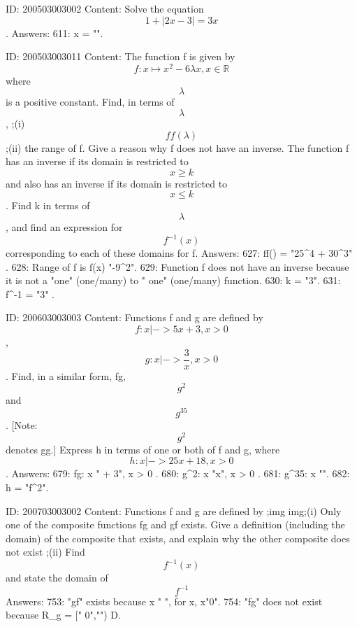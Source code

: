 \documentclass{article}
\begin{document}
ID: 200503003002
Content:
Solve the equation $$1+|2x-3|=3x$$. Answers:
611: x = "".

ID: 200503003011
Content:
The function f is given by $$f : x \mapsto x^2 - 6\lambda x, x \in \mathbb{R}$$ where $$\lambda$$ is a positive constant. Find, in terms of $$\lambda$$, ;(i) $$ff(\lambda)$$;(ii) the range of f. Give a reason why f does not have an inverse. The function f has an inverse if its domain is restricted to $$x \geq k$$ and also has an inverse if its domain is restricted to $$x \leq k$$. Find k in terms of $$\lambda$$, and find an expression for $$f^{- 1} ( x )$$ corresponding to each of these domains for f. Answers:
627: ff(\lambda) = "25\lambda^{4} + 30\lambda^{3}" .
628: Range of f is f(x) \geq "-9\lambda^{2}".
629: Function f does not have an inverse because it is not a "one" (one/many) to " one" (one/many) function.
630: k = "3\lambda".
631: f^{-1} = "3\lambda\pm{}" .

ID: 200603003003
Content:
Functions f and g are defined by $$f:x|->5x+3,x>0$$, $$g:x|->\frac{3}{x},x>0$$. Find, in a similar form, fg, $$g^{2}$$ and $$g^{35}$$.  [Note: $$g^{2}$$ denotes gg.] Express h in terms of one or both of f and g, where $$h:x|->25x+18,x>0$$. Answers:
679: fg: x \mapsto " + 3", x > 0 .
680: g^2: x \mapsto "x", x > 0 .
681: g^{35}: x \mapsto "".
682: h = "f^2".

ID: 200703003002
Content:
Functions f and g are defined by ;img img;(i) Only one of the composite functions fg and gf exists. Give a definition (including the domain) of the composite that exists, and explain why the other composite does not exist ;(ii) Find $$f^{-1}(x)$$ and state the domain of $$f^{-1}$$ Answers:
753: "gf" exists because x \mapsto " ", for x\in{}, x\neq "0".
754: "fg" does not exist because R_g = [" 0","\infty") \notin D.
\end{document}
